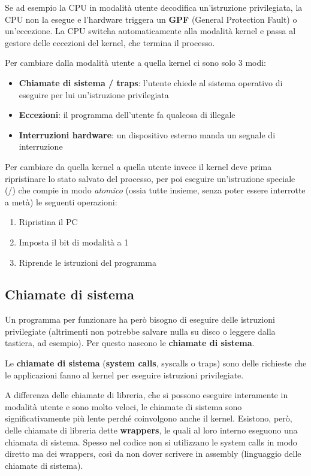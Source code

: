 \documentclass[11pt, a4paper, titlepage, oneside]{scrbook}
\begin{document}
Se ad esempio la CPU in modalità utente decodifica un'istruzione privilegiata, la CPU non la esegue e l'hardware triggera un \textbf{GPF} (General Protection Fault) o un'eccezione. La CPU switcha automaticamente alla modalità kernel e passa al gestore delle eccezioni del kernel, che termina il processo.

Per cambiare dalla modalità utente a quella kernel ci sono solo 3 modi:
\begin{itemize}
    \item \textbf{Chiamate di sistema / traps}: l'utente chiede al sistema operativo di eseguire per lui un'istruzione privilegiata
    \item \textbf{Eccezioni}: il programma dell'utente fa qualcosa di illegale
    \item \textbf{Interruzioni hardware}: un dispositivo esterno manda un segnale di interruzione
\end{itemize}

Per cambiare da quella kernel a quella utente invece il kernel deve prima ripristinare lo stato salvato del processo, per poi eseguire un'istruzione speciale (/) che compie in modo \textit{atomico} (ossia tutte insieme, senza poter essere interrotte a metà) le seguenti operazioni:
\begin{enumerate}[label=\arabic*°]
    \item Ripristina il PC
    \item Imposta il bit di modalità a 1
    \item Riprende le istruzioni del programma
\end{enumerate}

\subsection{Chiamate di sistema}

Un programma per funzionare ha però bisogno di eseguire delle istruzioni privilegiate (altrimenti non potrebbe salvare nulla su disco o leggere dalla tastiera, ad esempio). Per questo nascono le \textbf{chiamate di sistema}.

\begin{Definizione}
\label{def-chiamate-sistema}
Le \textbf{chiamate di sistema} (\textbf{system calls}, syscalls o traps) sono delle richieste che le applicazioni fanno al kernel per eseguire istruzioni privilegiate. 
\end{Definizione}

A differenza delle chiamate di libreria, che si possono eseguire interamente in modalità utente e sono molto veloci, le chiamate di sistema sono significativamente più lente perché coinvolgono anche il kernel. Esistono, però, delle chiamate di libreria dette \textbf{wrappers}, le quali al loro interno eseguono una chiamata di sistema. Spesso nel codice non si utilizzano le system calls in modo diretto ma dei wrappers, così da non dover scrivere in assembly (linguaggio delle chiamate di sistema).
\end{document}
